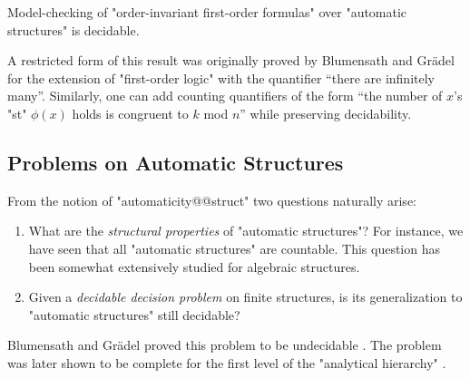 \begin{proposition}
	\label{prop:order-invariance}
	Model-checking of "order-invariant first-order formulas" over "automatic structures"
	is decidable.
\end{proposition}

A restricted form of this result was originally proved by Blumensath and Grädel
\cite[Corollary~5.4]{BlumensathGradel2004FinitePresentations} for the extension of
"first-order logic" with the quantifier ``there are infinitely many''.
Similarly, one can add counting quantifiers of the form ``the number of $x$'s "st" $\phi(x)$ holds
is congruent to $k$ mod $n$'' \cite[\S~3.2]{Rubin2008AutomataPresentingStructures}
while preserving decidability.

\subsection{Problems on Automatic Structures}

From the notion of "automaticity@@struct" two questions naturally arise:
\begin{enumerate}
	\item What are the \emph{structural properties} of "automatic structures"?
		For instance, we have seen that all "automatic structures" are countable.
		This question has been somewhat extensively studied for algebraic structures.
	\item Given a \emph{decidable decision problem} on finite structures, is its generalization
		to "automatic structures" still decidable?
\end{enumerate}

Blumensath and Grädel proved this problem
to be undecidable \cite[Theorem~5.15]{BlumensathGradel2004FinitePresentations}.
The problem was later shown to be complete for the first level
of the "analytical hierarchy" \cite[Theorem~5.9]{KhoussainovNiesRubinStephan2007Automatic}.


